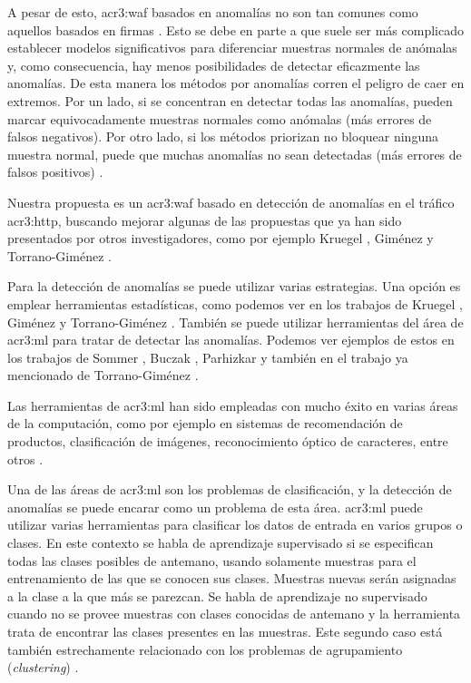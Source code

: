 A pesar de esto, \gls{acr3:waf} basados en anomalías no son tan comunes
como aquellos basados en firmas \cite{sommer2010outside}.
Esto se debe en parte a que suele ser más complicado establecer modelos
significativos para diferenciar muestras normales de anómalas y,
como consecuencia, hay menos posibilidades de detectar eficazmente
las anomalías. De esta manera los métodos por anomalías corren el peligro
de caer en extremos. Por un lado, si se concentran en detectar todas las
anomalías, pueden marcar equivocadamente muestras normales como anómalas
(más errores de falsos negativos). Por otro lado, si los métodos priorizan
no bloquear ninguna muestra normal, puede que muchas anomalías no sean
detectadas (más errores de falsos positivos) \cite{torranoGimenez2015study}.

Nuestra propuesta es un \gls{acr3:waf} basado en detección de anomalías
en el tráfico \gls{acr3:http}, buscando mejorar algunas de las propuestas
que ya han sido presentados por otros investigadores, como por ejemplo
Kruegel \cite{kruegel2003anomaly}, Giménez \cite{gimenez2015tfg} y
Torrano-Giménez \cite{torranoGimenez2015study}.
\bigskip

Para la detección de anomalías se puede utilizar varias estrategias.
Una opción es emplear herramientas estadísticas, como podemos ver en los
trabajos de Kruegel \cite{kruegel2003anomaly}, Giménez \cite{gimenez2015tfg}
y Torrano-Giménez \cite{torranoGimenez2015study}.
También se puede utilizar herramientas del área de \gls{acr3:ml}
\cite{torranoGimenez2015study} para tratar de detectar las anomalías.
Podemos ver ejemplos de estos en los trabajos de Sommer \cite{sommer2010outside},
Buczak \cite{buczak2016survey}, Parhizkar \cite{parhizkar2015oc}
y también en el trabajo ya mencionado de Torrano-Giménez
\cite{torranoGimenez2015study}.

Las herramientas de \gls{acr3:ml} han sido empleadas con mucho éxito
en varias áreas de la computación, como por ejemplo en sistemas de
recomendación de productos, clasificación de imágenes, reconocimiento
óptico de caracteres, entre otros \cite{torranoGimenez2015study}.

Una de las áreas de \gls{acr3:ml} son los problemas de clasificación, y la
detección de anomalías se puede encarar como un problema de esta área.
\gls{acr3:ml} puede utilizar varias herramientas para clasificar los
datos de entrada en varios grupos o clases.
En este contexto se habla de aprendizaje supervisado si se especifican
todas las clases posibles de antemano, usando solamente muestras para
el entrenamiento de las que se conocen sus clases. Muestras nuevas serán
asignadas a la clase a la que más se parezcan. Se habla de aprendizaje no
supervisado cuando no se provee muestras con clases conocidas de antemano
y la herramienta trata de encontrar las clases presentes en las muestras.
Este segundo caso está también estrechamente relacionado con los problemas
de agrupamiento (\textit{clustering}) \cite{torranoGimenez2015study}.

